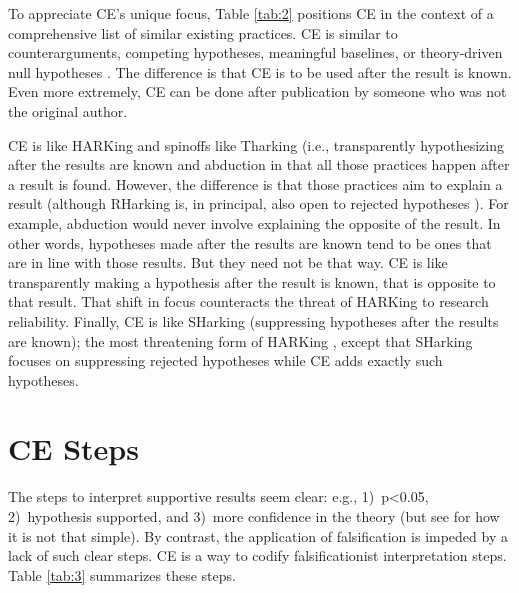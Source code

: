 \documentclass[authordate, meta,issue]{jote-new-article}
\begin{document}
To appreciate CE's unique focus, Table \ref{tab:2} positions CE in the context of a comprehensive list of similar existing practices. CE is similar to counterarguments, competing hypotheses, meaningful baselines, or theory-driven null hypotheses \parencite[e.g.,][]{Schwab2012}. The difference is that CE is to be used after the result is known. Even more extremely, CE can be done after publication by someone who was not the original author.


CE is like HARKing and spinoffs like Tharking (i.e., transparently hypothesizing after the results are known \parencite{Hollenbeck2017, Rubin2017} and abduction \parencite{Locke2008, Schwab2017} in that all those practices happen after a result is found. However, the difference is that those practices aim to explain a result (although RHarking is, in principal, also open to rejected hypotheses \parencite{Rubin2017}). For example, abduction would never involve explaining the opposite of the result. In other words, hypotheses made after the results are known tend to be ones that are in line with those results. But they need not be that way. CE is like transparently making a hypothesis after the result is known, that is opposite to that result. That shift in focus counteracts the threat of HARKing to research reliability. Finally, CE is like SHarking (suppressing hypotheses after the results are known); the most threatening form of HARKing \parencite{Rubin2017}, except that SHarking focuses on suppressing rejected hypotheses while CE adds exactly such hypotheses.

\section{CE Steps}

The steps to interpret supportive results seem clear: e.g., 1)\ p<0.05, 2)\ hypothesis supported, and 3)\ more confidence in the theory (but see \textcite{Wasserstein2019} for how it is not that simple). By contrast, the application of falsification is impeded by a lack of such clear steps. CE is a way to codify falsificationist interpretation steps. Table \ref{tab:3} summarizes these steps.
\end{document}
